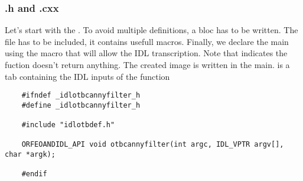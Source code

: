 \subsubsection{.h and .cxx}
Let's start with the . To avoid multiple definitions, a  bloc has to be written.
The  file has to be included, it contains usefull macros.
Finally, we declare the main using the macro  that will allow the IDL transcription.
Note that  indicates the fuction doesn't return anything. The created image is written in the main.
 is a tab containing the IDL inputs of the function 
\begin{verbatim}
    #ifndef _idlotbcannyfilter_h
    #define _idlotbcannyfilter_h

    #include "idlotbdef.h"

    ORFEOANDIDL_API void otbcannyfilter(int argc, IDL_VPTR argv[], char *argk);

    #endif
\end{verbatim}

